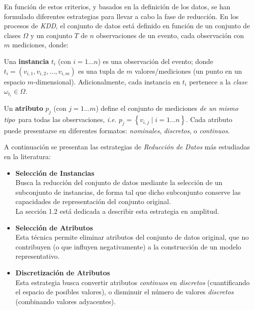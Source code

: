 En función de estos criterios, y basados en la definición de los datos, se han formulado diferentes estrategias para llevar a cabo la fase de reducción. En los procesos de \emph{KDD}, el conjunto de datos está definido en función de un conjunto de clases $\Omega$ y un conjunto $T$ de $n$ observaciones de un evento, cada observación con $m$ mediciones, donde:

\begin{definicion}
Una \textbf{instancia} $t_i$ (con $i = 1\dots n$) es una observación del evento; donde $t_i = (v_{i,1}, v_{i,2}, \dots, v_{i,m})$ es una tupla de $m$ valores/mediciones (un punto en un espacio $m$-dimensional). Adicionalmente, cada instancia en $t_i$ pertenece a la \emph{clase} $\omega_{t_i} \in \Omega$.
\end{definicion}

\begin{definicion}
Un \textbf{atributo} $p_j$ (con $j = 1\dots m$) define el conjunto de mediciones \guillemotleft\emph{de un mismo tipo}\guillemotright\ para todas las observaciones, \emph{i.e.} $p_j = \left\{ v_{i,j} \mid i = 1\dots n \right\}$. Cada atributo puede presentarse en diferentes formatos: \emph{nominales}, \emph{discretos}, o \emph{continuos}.
\end{definicion}

A continuación se presentan las estrategias de \emph{Reducción de Datos} más estudiadas en la literatura:

\begin{itemize}
\item \textbf{Selección de Instancias}
\cite{DBLP:journals/ai/BlumL97,Liu:2002:IIS:593433.593525}\\
Busca la reducción del conjunto de datos mediante la selección de un subconjunto de instancias, de forma tal que dicho subconjunto conserve las capacidades de representación del conjunto original.\\
La sección 1.2 está dedicada a describir esta estrategia en amplitud.
\item \textbf{Selección de Atributos}
\cite{DBLP:journals/ai/BlumL97, Liu:1998:FEC:551943}\\
Esta técnica permite eliminar atributos del conjunto de datos original, que no contribuyen (o que influyen negativamente) a la construcción de un modelo representativo.
\item \textbf{Discretización de Atributos}
\cite{DBLP:conf/ijcai/FayyadI93, Liu:2002:DET:593435.593535}\\
Esta estrategia busca convertir atributos \emph{continuos} en \emph{discretos} (cuantificando el espacio de posibles valores), o disminuir el número de valores \emph{discretos} (combinando valores adyacentes).
\end{itemize}

